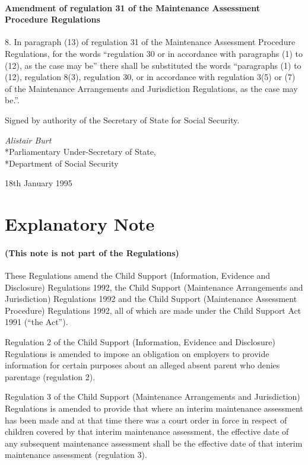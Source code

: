 \documentclass[a4paper]{article}
\newcommand{\parthead}{}
\begin{document}
\subsection[8. Amendment of regulation 31 of the Maintenance Assessment Procedure Regulations]{Amendment of regulation 31 of the Maintenance Assessment Procedure Regulations}

8.  In paragraph (13) of regulation 31 of the Maintenance Assessment Procedure Regulations, for the words “regulation 30 or in accordance with paragraphs (1) to (12), as the case may be” there shall be substituted the words “paragraphs (1) to (12), regulation 8(3), regulation 30, or in accordance with regulation 3(5) or (7) of the Maintenance Arrangements and Jurisdiction Regulations, as the case may be.”.

\bigskip

Signed by authority of the Secretary of State for Social Security.

{\raggedleft
\emph{Alistair Burt}\\*Parliamentary Under-Secretary of State,\\*Department of Social Security

}

18th January 1995

\part{Explanatory Note}

\renewcommand\parthead{--- Explanatory Note}

\subsection*{(This note is not part of the Regulations)}

These Regulations amend the Child Support (Information, Evidence and Disclosure) Regulations 1992, the Child Support (Maintenance Arrangements and Jurisdiction) Regulations 1992 and the Child Support (Maintenance Assessment Procedure) Regulations 1992, all of which are made under the Child Support Act 1991 (“the Act”).

  Regulation 2 of the Child Support (Information, Evidence and Disclosure) Regulations is amended to impose an obligation on employers to provide information for certain purposes about an alleged absent parent who denies parentage (regulation 2).

  Regulation 3 of the Child Support (Maintenance Arrangements and Jurisdiction) Regulations is amended to provide that where an interim maintenance assessment has been made and at that time there was a court order in force in respect of children covered by that interim maintenance assessment, the effective date of any subsequent maintenance assessment shall be the effective date of that interim maintenance assessment (regulation 3).
\end{document}
